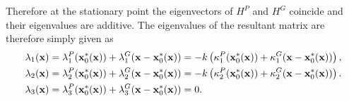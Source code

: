 Therefore at the stationary point the eigenvectors of $H^P$ and $H^G$ coincide and their eigenvalues are additive.
The eigenvalues of the resultant matrix are therefore simply given as
\begin{align}
\label{eq:app:propagated_curvature}
\lambda_1(\mathbf{x}) &= \lambda_1^P(\mathbf{x}_0^*(\mathbf{x})) + \lambda_1^G(\mathbf{x}-\mathbf{x}_0^*(\mathbf{x})) = -k \left( \kappa_1^P(\mathbf{x}_0^*(\mathbf{x})) + \kappa_1^G(\mathbf{x}-\mathbf{x}_0^*(\mathbf{x})) \right), \\
\lambda_2(\mathbf{x}) &= \lambda_2^P(\mathbf{x}_0^*(\mathbf{x})) + \lambda_2^G(\mathbf{x}-\mathbf{x}_0^*(\mathbf{x})) = -k \left( \kappa_2^P(\mathbf{x}_0^*(\mathbf{x})) + \kappa_2^G(\mathbf{x}-\mathbf{x}_0^*(\mathbf{x})) \right). \\
\lambda_3(\mathbf{x}) &= \lambda_3^P(\mathbf{x}_0^*(\mathbf{x})) + \lambda_3^G(\mathbf{x}-\mathbf{x}_0^*(\mathbf{x})) = 0.
\end{align}
\vspace{0.5mm}

